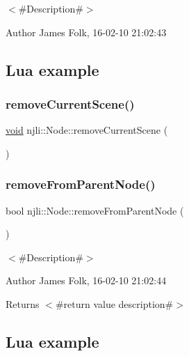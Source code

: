 $<$\#\+Description\#$>$ 

\begin{DoxyAuthor}{Author}
James Folk, 16-\/02-\/10 21\+:02\+:43
\end{DoxyAuthor}
\hypertarget{classnjli_1_1_steering_behavior_wander_ex1}{}\subsection{Lua example}\label{classnjli_1_1_steering_behavior_wander_ex1}

\begin{DoxyCodeInclude}
\end{DoxyCodeInclude}
\mbox{\label{classnjli_1_1_node_a7d33f50c3f40b5baf0d1a0028550a9fc}} 
\subsubsection{\texorpdfstring{remove\+Current\+Scene()}{removeCurrentScene()}}
{\footnotesize\ttfamily \mbox{\hyperlink{_thread_8h_af1e856da2e658414cb2456cb6f7ebc66}{void}} njli\+::\+Node\+::remove\+Current\+Scene (\begin{DoxyParamCaption}{ }\end{DoxyParamCaption})\hspace{0.3cm}{\ttfamily [protected]}}

\mbox{\label{classnjli_1_1_node_a100119ca086dab1c33416fad1d885e11}} 
\subsubsection{\texorpdfstring{remove\+From\+Parent\+Node()}{removeFromParentNode()}}
{\footnotesize\ttfamily bool njli\+::\+Node\+::remove\+From\+Parent\+Node (\begin{DoxyParamCaption}{ }\end{DoxyParamCaption})}



$<$\#\+Description\#$>$ 

\begin{DoxyAuthor}{Author}
James Folk, 16-\/02-\/10 21\+:02\+:44
\end{DoxyAuthor}
\begin{DoxyReturn}{Returns}
$<$\#return value description\#$>$
\end{DoxyReturn}
\hypertarget{classnjli_1_1_steering_behavior_wander_ex1}{}\subsection{Lua example}\label{classnjli_1_1_steering_behavior_wander_ex1}

